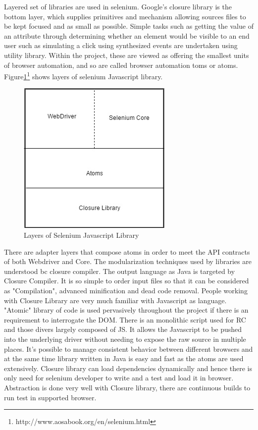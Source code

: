 \documentclass[article,type=msc,colorback,accentcolor=tud9c,twoside,11pt]{tudthesis}
\begin{document}
Layered set of libraries are used in selenium. Google's closure library is the bottom layer, which supplies primitives and mechanism allowing sources files to be kept focused and as small as possible. Simple tasks such as getting the value of an attribute through determining whether an element would be visible to an end user such as simulating a click using synthesized events are undertaken using utility library. Within the project, these are viewed as offering the smallest units of browser automation, and so are called browser automation toms or atoms. 
 Figure\ref{fig:LayersofSeleniumJSLibrary}\footnote{http://www.aosabook.org/en/selenium.html} shows layers of selenium Javascript library.
\begin{figure}[h]
	\centering
	\includegraphics[scale=0.6]{LayersofSeleniumJSLibrary}
	\caption{Layers of Selenium Javascript Library}
	\label{fig:LayersofSeleniumJSLibrary}
\end{figure}
There are adapter layers that compose atoms in order to meet the API contracts of both Webdriver and Core. The modularization techniques used by libraries are understood bc closure compiler. The output language as Java is targeted by Closure Compiler. It is so simple to order input files so that it can be considered as "Compilation", advanced minification and dead code removal. People working with Closure Library are very much familiar with Javascript as language. "Atomic" library of code is used pervasively throughout the project if there is an requirement to interrogate the DOM. There is an monolithic script used for RC and those divers largely composed of JS. It allows the Javascript to be pushed into the underlying driver without needing to expose the raw source in multiple places. It's possible to manage consistent behavior between different browsers and at the same time library written in Java is easy and fast as the atoms are used extensively. Closure library can load dependencies dynamically and hence there is only need for selenium developer to write and a test and load it in browser. Abstraction is done very well with Closure library, there are continuous builds to run test in supported browser.
\end{document}
